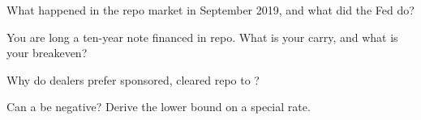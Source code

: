 \begin{interviewq}\label{iq:m2:repo-and-specials:3}
What happened in the repo market in September 2019, and what did the Fed do?
\end{interviewq}

\begin{interviewq}\label{iq:m2:repo-and-specials:4}
You are long a ten-year note financed in repo. What is your carry, and what is
your breakeven?
\end{interviewq}

\begin{interviewq}\label{iq:m2:repo-and-specials:5}
Why do dealers prefer sponsored, cleared repo to ?
\end{interviewq}

\begin{interviewq}\label{iq:m2:repo-and-specials:6}
Can a  be negative? Derive the lower bound on a special rate.
\end{interviewq}
